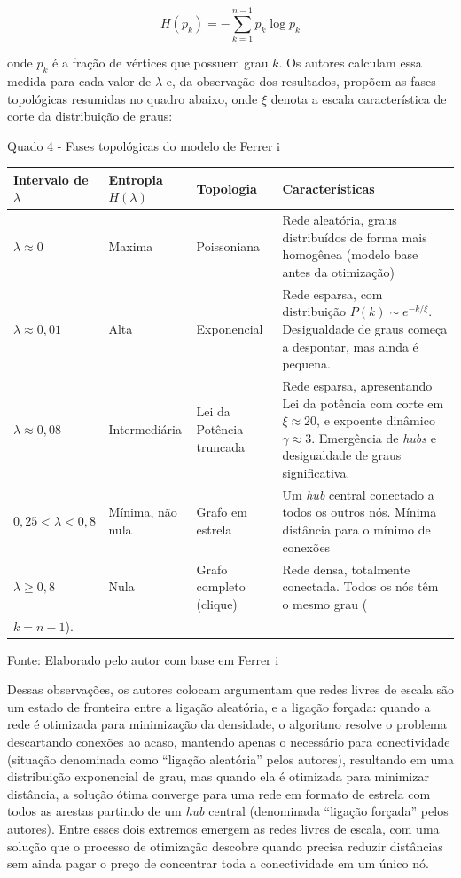 \documentclass[12pt,oneside,a4paper,brazil,sumario=tradicional]{abntex2}
\begin{document}
\[H(p_{k}) = -\sum_{k=1}^{n-1} p_{k}\log p_{k}\]

onde $p_{k}$ é a fração de vértices que possuem grau $k$. Os autores calculam essa medida para cada valor de $\lambda$ e, da observação dos resultados, propõem as fases topológicas resumidas no quadro abaixo, onde $\xi$ denota a escala característica de corte da distribuição de graus:

Quado 4 - Fases topológicas do modelo de Ferrer i 

\begin{center}
\begin{tabular}{p{4cm}|p{4cm}|p{4cm}|p{4cm}}
\toprule
\textbf{Intervalo de }$\lambda$ & \textbf{Entropia}$H(\lambda)$ & \textbf{Topologia} & \textbf{Características} \\
\midrule
$\lambda \approx 0$ & Maxima & Poissoniana & Rede aleatória, graus distribuídos de forma mais homogênea (modelo base\textit{ }antes da otimização) \\
$\lambda \approx 0{,}01$ & Alta & Exponencial & Rede esparsa, com distribuição $P(k) \sim e^{-k/\xi}$. Desigualdade de graus começa a despontar, mas ainda é pequena. \\
$\lambda \approx 0{,}08$ & Intermediária & Lei da Potência truncada & Rede esparsa, apresentando Lei da potência com corte em $\xi \approx 20$, e expoente dinâmico $\gamma \approx 3$. Emergência de \textit{hubs} e desigualdade de graus significativa. \\
$0{,}25 < \lambda < 0{,}8$ & Mínima, não nula & Grafo em estrela & Um \textit{hub} central conectado a todos os outros nós. Mínima distância para o mínimo de conexões \\
$\lambda \ge 0{,}8$ & Nula & Grafo completo (clique) & Rede densa, totalmente conectada. Todos os nós têm o mesmo grau (\\$k = n-1$). \\
\bottomrule
\end{tabular}
\end{center}
Fonte: Elaborado pelo autor com base em Ferrer i 

Dessas observações, os autores colocam argumentam que redes livres de escala são um estado de fronteira entre a ligação aleatória, e a ligação forçada: quando a rede é otimizada para minimização da densidade, o algoritmo resolve o problema descartando conexões ao acaso, mantendo apenas o necessário para conectividade (situação denominada como “ligação aleatória” pelos autores), resultando em uma distribuição exponencial de grau, mas quando ela é otimizada para minimizar distância, a solução ótima converge para uma rede em formato de estrela com todos as arestas partindo de um \textit{hub }central (denominada “ligação forçada” pelos autores). Entre esses dois extremos emergem as redes livres de escala, com uma solução que o processo de otimização descobre quando precisa reduzir distâncias sem ainda pagar o preço de concentrar toda a conectividade em um único nó.
\end{document}
